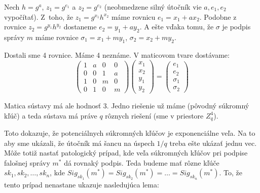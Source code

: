 \begin{dokaz}
    Nech $h = g^a$, $z_1 = g^{e_1}$ a $z_2 = g^{e_2}$ 
    (neobmedzene silný útočník vie $a, e_1, e_2$ vypočítať).
    Z~toho, že $z_1 = g^{x_1} h^{x_2}$ máme rovnicu $e_1 = x_1 + ax_2$.
    Podobne z rovnice $z_2 = g^{y_1} h^{y_2}$ dostaneme $e_2 = y_1 + a y_2$.
    A ešte vďaka tomu, že $\sigma$ je podpis správy $m$ máme rovnice
    $\sigma_1 = x_1 + my_1$, $\sigma_2 = x_2 + my_2$. 

    Dostali sme 4 rovnice. Máme 4 neznáme. V maticovom tvare dostávame:
    \begin{equation*}
        \left ( \begin{matrix}
                    1 & a & 0 & 0 \\
                    0 & 0 & 1 & a \\
                    1 & 0 & m & 0 \\
                    0 & 1 & 0 & m
                \end{matrix}
        \right )
        \left ( \begin{matrix}
                    x_1 \\
                    x_2 \\
                    y_1 \\
                    y_2
                \end{matrix}
        \right )
        =
        \left ( \begin{matrix} 
                    e_1 \\
                    e_2 \\
                    \sigma_1\\
                    \sigma_2
                \end{matrix}
        \right )
    \end{equation*}

    Matica sústavy má ale hodnosť $3$. Jedno riešenie už máme (pôvodný
    súkromný kľúč) a teda sústava má práve $q$ rôznych riešení (sme v
    priestore $Z_q^4$).
\end{dokaz}

Toto dokazuje, že potenciálnych súkromných kľúčov je exponenciálne veľa.
Na to aby sme ukázali, že útočník má
šancu na úspech $1/q$ treba ešte ukázať jednu vec.
Môže totiž nastať patologický prípad, kde veľa súkromných kľúčov
pri podpise falošnej správy $m^*$ dá rovnaký podpis.
Teda budeme mať rôzne kľúče $sk_1, sk_2, \dots, sk_n$,
kde $Sig_{sk_1}(m^*) = Sig_{sk_2}(m^*) = \dots = Sig_{sk_n}(m^*)$.
To, že tento prípad nenastane ukazuje nasledujúca lema:

